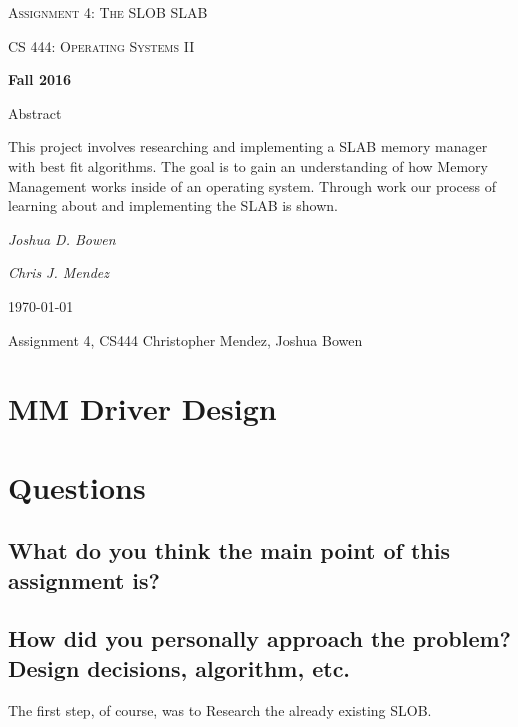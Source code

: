 \documentclass[letterpaper,10pt,titlepage]{article}
\begin{document}
\begin{titlepage}
	\centering
	\vspace*{4cm}
	{\scshape\huge Assignment 4: The SLOB SLAB\par}
	\vspace{1cm}
	{\scshape\LARGE CS 444: Operating Systems II\par}
	\vspace{0.5cm}
	{\large\bfseries Fall 2016\par}
	{\large Abstract\par}
	\vspace {0.5cm}
		This project involves researching and implementing a SLAB memory manager with best fit algorithms. The goal is to gain an understanding of how Memory Management works inside of an operating system. Through work our process of learning about and implementing the SLAB is shown.
	\par
	\vspace{1cm}
	{\Large\itshape Joshua D. Bowen\par}
	{\Large\itshape Chris J. Mendez\par}
	\vfill
	{\large \today\par}	

\end{titlepage}

Assignment 4, CS444
Christopher Mendez, Joshua Bowen



\section{MM Driver Design}



\section{Questions}
\subsection{What do you think the main point of this assignment is?}

 \sloppy 

\subsection{How did you personally approach the problem? Design decisions, algorithm, etc.}

\sloppy The first step, of course, was to Research the already existing SLOB. 
\end{document}
